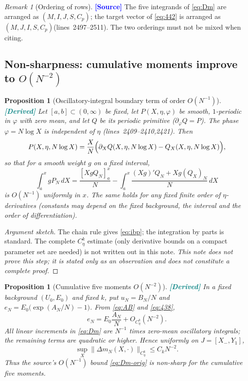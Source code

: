 \documentclass[11pt,a4paper]{article}
\newtheorem{proposition}[theorem]{Proposition}
\theoremstyle{definition}
\theoremstyle{remark}
\newtheorem{remark}[theorem]{Remark}
\newcommand{\lnos}[1]{(lines~#1)}
\newcommand{\ORIG}{\textcolor{blue}{\textbf{[Source]}}}
\newcommand{\DER}{\textcolor{teal}{\textbf{[Derived]}}}
\newcommand{\notproved}{\emph{This note does not prove this step; it is stated only as an observation
and does not constitute a complete proof.}}
\begin{document}
\begin{remark}[Ordering of rows]
\ORIG
The five integrands of \eqref{eq:Dm} are arranged as $(M,I,J,S,C_p)$;
the target vector of \eqref{eq:442} is arranged as $(M,J,I,S,C_p)$\lnos{2497--2511}.
The two orderings must not be mixed when citing.
\end{remark}

\subsection{Non-sharpness: cumulative moments improve to \texorpdfstring{$O(N^{-2})$}{O(N\textasciicircum -2)}}
\label{sec:note1-der}

\begin{proposition}[Oscillatory-integral boundary term of order $O(N^{-1})$]
\label{prop:osc}
\DER
Let $[a,b]\subset(0,\infty)$ be fixed, let $P(X,\eta,\varphi)$ be smooth, $1$-periodic in $\varphi$ with
zero mean, and let $Q$ be its periodic primitive ($\partial_\varphi Q=P$). The phase $\varphi=N\log X$
is independent of $\eta$ \lnos{2409--2410,2421}. Then
\begin{equation}
\label{eq:ibp}
P(X,\eta,N\log X)
=\frac{X}{N}\Bigl(\partial_X Q(X,\eta,N\log X)-Q_X(X,\eta,N\log X)\Bigr),
\end{equation}
so that for a smooth weight $g$ on a fixed interval,
\[
\int_a^x g P_N\,dX
=\frac{[Xg Q_N]_a^x}{N}
-\int_a^x\frac{(Xg)'Q_N+Xg(Q_X)_N}{N}\,dX
\]
is $O(N^{-1})$ uniformly in $x$. The same holds for any fixed finite order of $\eta$-derivatives
(constants may depend on the fixed background, the interval and the order of differentiation).
\end{proposition}

\begin{proof}[Argument sketch]
The chain rule gives \eqref{eq:ibp}; the integration by parts is standard.
The complete $C^k_\eta$ estimate (only derivative bounds on a compact parameter set are needed) is not
written out in this note.
\notproved
\end{proof}

\begin{proposition}[Cumulative five moments $O(N^{-2})$]
\label{prop:N2}
\DER
In a fixed background $(U_0,E_0)$ and fixed $k$, put $u_N=B_N/N$ and
$e_N=E_0\bigl(\exp(A_N/N)-1\bigr)$. From \eqref{eq:AB} and \eqref{eq:438},
\begin{equation}
\label{eq:e-exp}
e_N=E_0\frac{A_N}{N}+O_{C^k_\eta}(N^{-2}).
\end{equation}
All linear increments in \eqref{eq:Dm} are $N^{-1}$ times zero-mean oscillatory integrals;
the remaining terms are quadratic or higher. Hence uniformly on $J=[X_-,Y_1]$,
\begin{equation}
\label{eq:N2}
\sup_X\|\Delta m_N(X,\cdot)\|_{C^k_\eta}\le C_k N^{-2}.
\end{equation}
Thus the source's $O(N^{-1})$ bound \eqref{eq:Dm-orig} is non-sharp for the \emph{cumulative} five moments.
\end{proposition}
\end{document}
